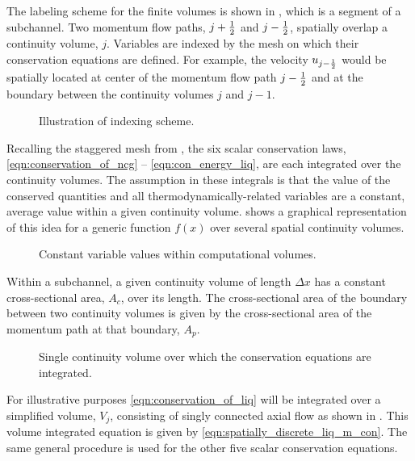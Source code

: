 The labeling scheme for the finite volumes is shown in , which is a segment of a subchannel.
Two momentum flow paths, $j + \onehalf $ and $j - \onehalf$, spatially overlap a continuity volume, $j$.
Variables are indexed by the mesh on which their conservation equations are defined.
For example, the velocity $u_{j - \onehalf}$ would be spatially located at center of the momentum flow path $j - \onehalf $ and at the boundary between the continuity volumes $j$ and $j-1$.

\begin{figure}[ht!]
\centering

\caption{Illustration of indexing scheme.}
\label{fig:vertical_pipe_with_cells}
\end{figure}

Recalling the staggered mesh from , the six scalar conservation laws, \eqref{eqn:conservation_of_ncg} -- \eqref{eqn:con_energy_liq}, are each integrated over the continuity volumes.
The assumption in these integrals is that the value of the conserved quantities and all thermodynamically-related variables are a constant, average value within a given continuity volume.
 shows a graphical representation of this idea for a generic function $f(x)$ over several spatial continuity volumes. 

\begin{figure}[ht!]
\centering

\caption{Constant variable values within computational volumes.}
\label{fig:constant_value}
\end{figure}

Within a subchannel, a given continuity volume of length $\Delta x $ has a constant cross-sectional area, $A_{c}$, over its length.
The cross-sectional area of the boundary between two continuity volumes is given by the cross-sectional area of the momentum path at that boundary, $A_{p}$.

\begin{figure}[ht!]
\centering

\caption{Single continuity volume over which the conservation equations are integrated.}
\label{fig:single_volume}
\end{figure}

For illustrative purposes \eqref{eqn:conservation_of_liq} will be integrated over a simplified volume, $V_j$, consisting of singly connected axial flow as shown in .
This volume integrated equation is given by \eqref{eqn:spatially_discrete_liq_m_con}.
The same general procedure is used for the other five scalar conservation equations.

